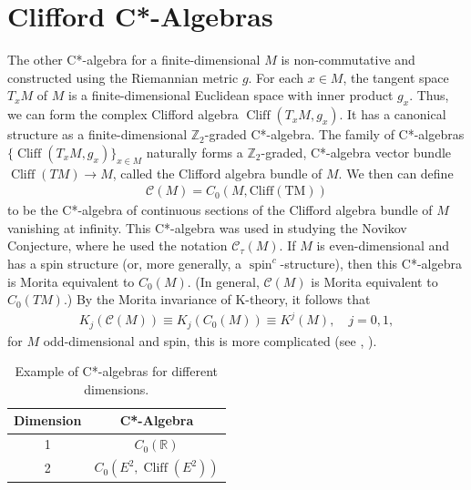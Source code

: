 \documentclass[11pt, twoside, a4paper]{article}
\theoremstyle{mytheoremstyle}
\begin{document}
\section{Clifford C*-Algebras}
The other C*-algebra for a finite-dimensional \(M\) is non-commutative and constructed using the Riemannian metric \(g\). For each \(x \in M\), the tangent space \(T_{x}M\) of \(M\) is a finite-dimensional Euclidean space with inner product \(g_{x}\). Thus, we can form the complex Clifford algebra \(\operatorname{Cliff}(T_{x}M,g_{x})\). It has a canonical structure as a finite-dimensional \(\mathbb{Z}_{2}\)-graded C*-algebra. The family of C*-algebras \(\{\operatorname{Cliff}(T_{x}M,g_{x})\}_{x \in M}\) naturally forms a \(\mathbb{Z}_{2}\)-graded, C*-algebra vector bundle \(\operatorname{Cliff}(T M)\to M\), called the Clifford algebra bundle of \(M\). We then can define
\begin{align}
    \mathcal{C}(M) = C_{0}(M, \operatorname{Cliff(T M)})
\end{align}
to be the C*-algebra of continuous sections of the Clifford algebra bundle of \(M\) vanishing at infinity. This C*-algebra was used in studying the Novikov Conjecture, where he used the notation \(\mathcal{C}_{\tau} (M)\). If \(M\) is even-dimensional and has a spin structure (or, more generally, a \(\operatorname{spin}^{c}\)-structure), then this C*-algebra is Morita equivalent to \(C_{0}(M)\). (In general, \(\mathcal{C}(M)\) is Morita equivalent to \(C_{0}(T M)\).) By the Morita invariance of K-theory, it follows that
\begin{align}
    K_{j}(\mathcal{C}(M)) \equiv K_{j}(C_{0}(M)) \equiv K^{j}(M), \quad j=0,1,
\end{align}
for \(M\) odd-dimensional and spin, this is more complicated (see {\color{blue}\cite{tromba1988}}, {\color{blue}\cite{hajac1999}}).

\begin{table}[ht]
\centering
\begin{tabular}{|c|c|}
\hline
\textbf{Dimension} & \textbf{C*-Algebra} \\
\hline
1 & \(C_{0}(\mathbb{R})\) \\
\hline
2 & \(C_{0}(E^{2}, \operatorname{Cliff}(E^{2}))\) \\
\hline
\end{tabular}
\caption{Example of C*-algebras for different dimensions.}
\end{table}
\end{document}
